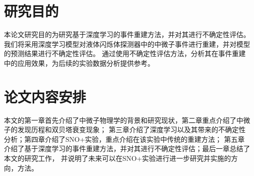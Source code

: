 \section{研究目的}

本论文研究目的为研究基于深度学习的事件重建方法，并对其进行不确定性评估。
我们将采用深度学习模型对液体闪烁体探测器中的中微子事件进行重建，并对模型的预测结果进行不确定性评估。
通过使用不确定性评估方法，分析其在事件重建中的应用效果，为后续的实验数据分析提供参考。

\section{论文内容安排}

本文的第一章首先介绍了中微子物理学的背景和研究现状，第二章重点介绍了中微子的发现历程和双贝塔衰变现象；
第三章介绍了深度学习以及其带来的不确定性分析；第四章介绍了SNO+实验，重点介绍在该实验中传统的重建方法；
第五章介绍了基于深度学习的事件重建方法，并对其进行不确定性评估；最后一章总结了本文的研究工作，
并说明了未来可以在SNO+实验进行进一步研究并实施的方向，方法。